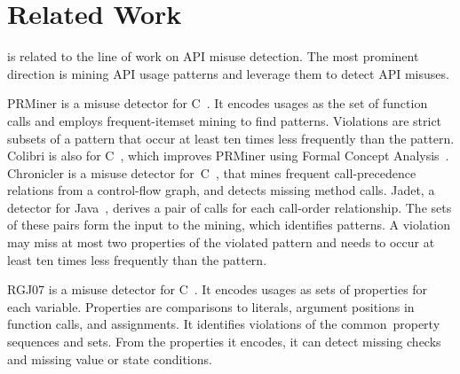 \section{Related Work}
\label{sec: related}

{\tool} is related to the line of work on API misuse detection.
The most prominent direction is mining API usage patterns
and leverage them to detect API misuses.

PRMiner is a misuse detector for C~\cite{LZ05}. It encodes usages as
the set of function calls and employs frequent-itemset mining to find
patterns. Violations are strict subsets of a pattern that occur at
least ten times less frequently than the pattern. Colibri is also for
C~\cite{L07}, which improves PRMiner using Formal Concept
Analysis~\cite{GW99}. Chronicler is a misuse detector
for~C~\cite{RGJ07b}, that mines frequent call-precedence relations
from a control-flow graph, and detects missing
method calls. Jadet, a detector for Java~\cite{WZL07},
%
derives a pair of calls for each call-order relationship. The
sets of these pairs form the input to the mining, which identifies
patterns. A violation may miss at most two properties of the violated
pattern and needs to occur at least ten times less frequently than the
pattern.

RGJ07 is a misuse detector for C~\cite{RGJ07}.  It encodes usages as
sets of properties for each variable.  Properties are comparisons to
literals, argument positions in function calls, and assignments.
%
It identifies violations of the common~property sequences and sets.
From the properties it encodes, it can detect missing  checks and missing value or state conditions.

